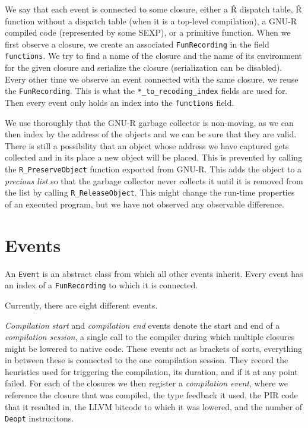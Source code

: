 We say that each event is connected to some closure, either a Ř dispatch table, Ř function without a dispatch table (when it is a top-level compilation), a GNU-R compiled code (represented by some SEXP), or a primitive function. When we first observe a closure, we create an associated \texttt{FunRecording} in the field \texttt{functions}. We try to find a name of the closure and the name of its environment for the given closure and serialize the closure (serialization can be disabled). Every other time we observe an event connected with the same closure, we reuse the \texttt{FunRecording}. This is what the \texttt{*\_to\_recoding\_index} fields are used for. Then every event only holds an index into the \texttt{functions} field.

We use thoroughly that the GNU-R garbage collector is non-moving, as we can then index by the address of the objects and we can be sure that they are valid. There is still a possibility that an object whose address we have captured gets collected and in its place a new object will be placed. This is prevented by calling the \texttt{R\_PreserveObject} function exported from GNU-R. This adds the object to a \textit{precious list} so that the garbage collector never collects it until it is removed from the list by calling \texttt{R\_ReleaseObject}. This might change the run-time properties of an executed program, but we have not observed any observable difference.

\section{Events}

An \texttt{Event} is an abstract class from which all other events inherit. Every event has an index of a \texttt{FunRecording} to which it is connected.

Currently, there are eight different events.

\textit{Compilation start} and \textit{compilation end} events denote the start and end of a \textit{compilation session}, a single call to the compiler during which multiple closures might be lowered to native code. These events act as brackets of sorts, everything in between these is connected to the one compilation session. They record the heuristics used for triggering the compilation, its duration, and if it at any point failed. For each of the closures we then register a \textit{compilation event}, where we reference the closure that was compiled, the type feedback it used, the PIR code that it resulted in, the LLVM bitcode to which it was lowered, and the number of \texttt{Deopt} instrucitons.

